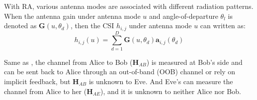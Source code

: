 With RA, various antenna modes are associated with different radiation patterns. When the antenna gain under antenna mode $u$ and angle-of-departure $\theta_{l}$ is denoted as $\mathbf{G}(u,\theta_d)$, then the CSI $h_{i,j}$ under antenna mode $u$ can written as:
\begin{equation}
  h_{i,j}(u)=\sum\limits_{d=1}^{D}\mathbf{G}(u,\theta_{d})\mathbf{a}_{i,j}(\theta_d)
  \label{eq:hh}
\end{equation}

%


Same as \cite{anand2012strobe,schulz2014practical,zheng2016profiling}, the channel from Alice to Bob ($\mathbf{H}_{AB}$) is measured at Bob's side and can be sent back to Alice through an out-of-band (OOB) channel or rely on implicit feedback, but $\mathbf{H}_{AB}$ is unknown to Eve. And Eve's can measure the channel from Alice to her ($\mathbf{H}_{AE}$), and it is unknown to neither Alice nor Bob. 